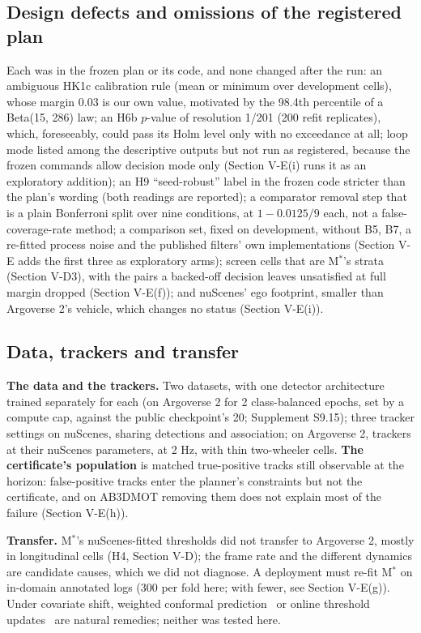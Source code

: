 \documentclass{ieeeaccess}
\begin{document}
\subsection{Design defects and omissions of the registered plan}
Each was in the frozen plan or its code, and none changed after the run: an ambiguous HK1c calibration rule (mean or minimum over development cells), whose margin 0.03 is our own value, motivated by the 98.4th percentile of a Beta(15, 286) law; an H6b $p$-value of resolution 1/201 (200 refit replicates), which, foreseeably, could pass its Holm level only with no exceedance at all; loop mode listed among the descriptive outputs but not run as registered, because the frozen commands allow decision mode only (Section V-E(i) runs it as an exploratory addition); an H9 ``seed-robust'' label in the frozen code stricter than the plan's wording (both readings are reported); a comparator removal step that is a plain Bonferroni split over nine conditions, at $1 - 0.0125/9$ each, not a false-coverage-rate method; a comparison set, fixed on development, without B5, B7, a re-fitted process noise and the published filters' own implementations (Section V-E adds the first three as exploratory arms); screen cells that are M$^{*}$'s strata (Section V-D3), with the pairs a backed-off decision leaves unsatisfied at full margin dropped (Section V-E(f)); and nuScenes' ego footprint, smaller than Argoverse 2's vehicle, which changes no status (Section V-E(i)).

\subsection{Data, trackers and transfer}
\textbf{The data and the trackers.} Two datasets, with one detector architecture trained separately for each (on Argoverse 2 for 2 class-balanced epochs, set by a compute cap, against the public checkpoint's 20; Supplement S9.15); three tracker settings on nuScenes, sharing detections and association; on Argoverse 2, trackers at their nuScenes parameters, at 2 Hz, with thin two-wheeler cells. \textbf{The certificate's population} is matched true-positive tracks still observable at the horizon: false-positive tracks enter the planner's constraints but not the certificate, and on AB3DMOT removing them does not explain most of the failure (Section V-E(h)).

\textbf{Transfer.} M$^{*}$'s nuScenes-fitted thresholds did not transfer to Argoverse 2, mostly in longitudinal cells (H4, Section V-D); the frame rate and the different dynamics are candidate causes, which we did not diagnose. A deployment must re-fit M$^{*}$ on in-domain annotated logs (300 per fold here; with fewer, see Section V-E(g)). Under covariate shift, weighted conformal prediction~\cite{Tibshirani2019} or online threshold updates~\cite{GibbsCandes2021} are natural remedies; neither was tested here.
\end{document}
